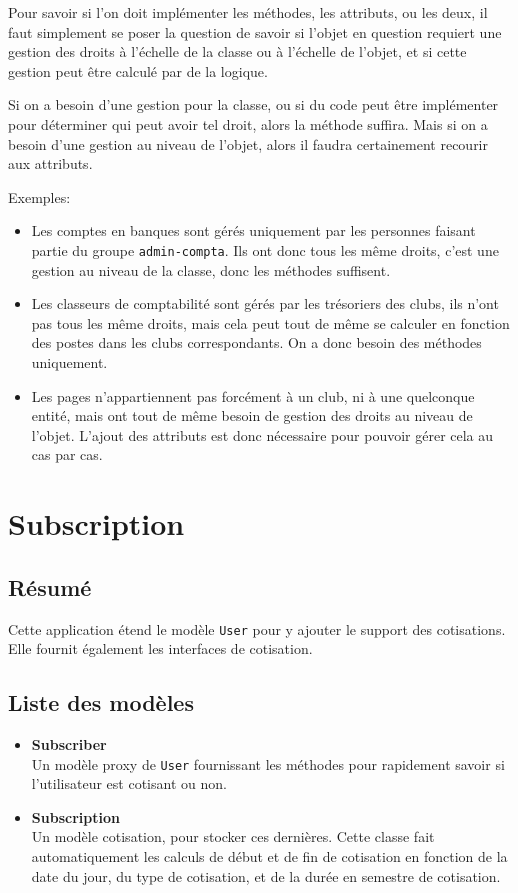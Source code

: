 \documentclass[a4paper]{report}
\begin{document}
\par Pour savoir si l'on doit implémenter les méthodes, les attributs, ou les deux, il faut simplement se poser la
question de savoir si l'objet en question requiert une gestion des droits à l'échelle de la classe ou à l'échelle de
l'objet, et si cette gestion peut être calculé par de la logique.
\par Si on a besoin d'une gestion pour la classe, ou si du code peut être implémenter pour déterminer qui peut avoir tel
droit, alors la méthode suffira. Mais si on a besoin d'une gestion au niveau de l'objet, alors il faudra certainement
recourir aux attributs.
\par Exemples:
\begin{itemize}
    \item Les comptes en banques sont gérés uniquement par les personnes faisant partie du groupe \verb#admin-compta#.
        Ils ont donc tous les même droits, c'est une gestion au niveau de la classe, donc les méthodes suffisent.
    \item Les classeurs de comptabilité sont gérés par les trésoriers des clubs, ils n'ont pas tous les même droits,
        mais cela peut tout de même se calculer en fonction des postes dans les clubs correspondants. On a donc besoin
        des méthodes uniquement.
    \item Les pages n'appartiennent pas forcément à un club, ni à une quelconque entité, mais ont tout de même besoin de
        gestion des droits au niveau de l'objet. L'ajout des attributs est donc nécessaire pour pouvoir gérer cela au
        cas par cas.
\end{itemize}

\section{Subscription}
\label{sec:subscription}
\subsection{Résumé}
\label{sub:r_sum_}
\par Cette application étend le modèle \verb#User# pour y ajouter le support des cotisations. Elle fournit également les
interfaces de cotisation.

\subsection{Liste des modèles}
\label{sub:liste_des_mod_les}
\begin{itemize}
    \item \textbf{Subscriber} \\
        Un modèle proxy de \verb#User# fournissant les méthodes pour rapidement savoir si l'utilisateur est cotisant ou
        non.
    \item \textbf{Subscription} \\
        Un modèle cotisation, pour stocker ces dernières. Cette classe fait automatiquement les calculs de début et de
        fin de cotisation en fonction de la date du jour, du type de cotisation, et de la durée en semestre de
        cotisation.
\end{itemize}
\end{document}
